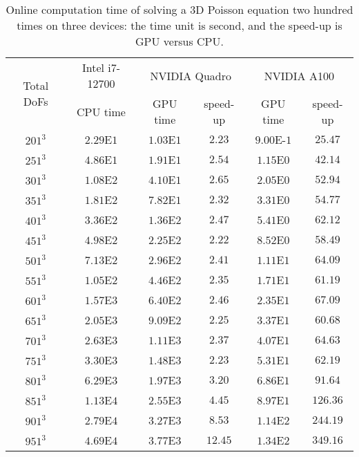 \documentclass{article}
\begin{document}
\begin{table}[!ht]
    \centering
    \begin{tabular}{|c|c|c c|c c|}
    \hline
     \multirow{2}{*}{Total DoFs}& Intel i7-12700 & \multicolumn{2}{c|}{NVIDIA Quadro} & \multicolumn{2}{c|}{NVIDIA A100}\\
     \cline{2-6} 
          & CPU time  & GPU time & speed-up & GPU time & speed-up\\
    \hline
          $201^3$ & $2.29$E$1$ & $1.03$E$1$ & $2.23$ & $9.00$E-$1$& $25.47$ \\
    \hline
          $251^3$ & $4.86$E$1$ & $1.91$E$1$ & $2.54$ & $1.15$E$0$ & $42.14$ \\
    \hline
          $301^3$ & $1.08$E$2$ & $4.10$E$1$ & $2.65$ & $2.05$E$0$ & $52.94$ \\
    \hline
          $351^3$ & $1.81$E$2$ & $7.82$E$1$ & $2.32$ & $3.31$E$0$ & $54.77$ \\
    \hline
          $401^3$ & $3.36$E$2$ & $1.36$E$2$ & $2.47$ & $5.41$E$0$ & $62.12$ \\
    \hline
          $451^3$ & $4.98$E$2$ & $2.25$E$2$ & $2.22$ & $8.52$E$0$ & $58.49$ \\
    \hline
          $501^3$ & $7.13$E$2$ & $2.96$E$2$ & $2.41$ & $1.11$E$1$ & $64.09$ \\
    \hline
          $551^3$ & $1.05$E$2$ & $4.46$E$2$ & $2.35$ & $1.71$E$1$ & $61.19$ \\
    \hline
          $601^3$ & $1.57$E$3$ & $6.40$E$2$ & $2.46$ & $2.35$E$1$ & $67.09$ \\
    \hline
          $651^3$ & $2.05$E$3$ & $9.09$E$2$ & $2.25$ & $3.37$E$1$ & $60.68$ \\
    \hline
          $701^3$ & $2.63$E$3$ & $1.11$E$3$ & $2.37$ & $4.07$E$1$ & $64.63$ \\
    \hline
          $751^3$ & $3.30$E$3$ & $1.48$E$3$ & $2.23$ & $5.31$E$1$ & $62.19$ \\
    \hline
          $801^3$ & $6.29$E$3$ & $1.97$E$3$ & $3.20$ & $6.86$E$1$ & $91.64$ \\
    \hline
          $851^3$ & $1.13$E$4$ & $2.55$E$3$ & $4.45$ & $8.97$E$1$ & $126.36$ \\
    \hline
          $901^3$ & $2.79$E$4$ & $3.27$E$3$ & $8.53$ & $1.14$E$2$ & $244.19$ \\
    \hline
          $951^3$ & $4.69$E$4$ & $3.77$E$3$ & $12.45$ & $1.34$E$2$ & $349.16$ \\
    \hline
    \end{tabular}
    \caption{Online computation time of solving a 3D Poisson equation two hundred times on three devices: the time unit is second, and the speed-up is GPU versus CPU. }
    \label{tab2:poisson_cpu_gpu}
\end{table}
\end{document}
